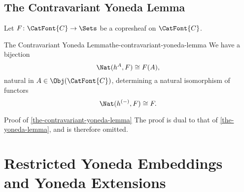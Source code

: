 \subsection{The Contravariant Yoneda Lemma}\label{subsection-the-contravariant-yoneda-lemma}
Let $F\colon\CatFont{C}\to\Sets$ be a copresheaf on $\CatFont{C}$.
\begin{theorem}{The Contravariant Yoneda Lemma}{the-contravariant-yoneda-lemma}%
    We have a bijection
    \[
        \Nat(h^{A},F)
        \cong
        F(A),
    \]%
    natural in $A\in\Obj(\CatFont{C})$, determining a natural isomorphism of functors
    \[
        \Nat(h^{(-)},F)
        \cong
        F.
    \]%
\end{theorem}
\begin{Proof}{Proof of \cref{the-contravariant-yoneda-lemma}}%
    The proof is dual to that of \cref{the-yoneda-lemma}, and is therefore omitted.
\end{Proof}%
\section{Restricted Yoneda Embeddings and Yoneda Extensions}\label{section-restricted-yoneda-embeddings-and-yoneda-extensions}
